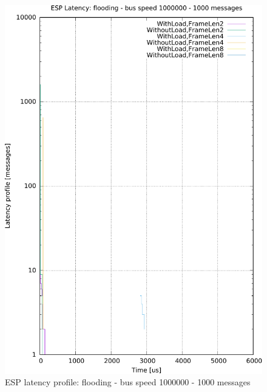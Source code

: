 \documentclass{ctuthesis}
\begin{document}
\begin{figure}[htb]
\includegraphics[width=\linewidth]{figures/speed1000000_messages1000_floodTrue.pdf}
\caption{ESP latency profile: flooding - bus speed 1000000 - 1000 messages}
\end{figure}
\end{document}
